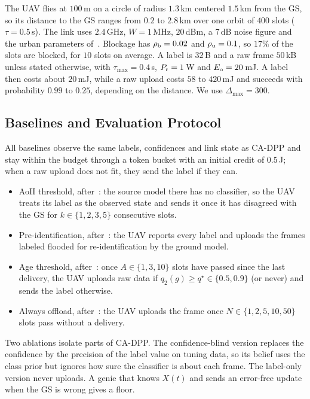 The UAV flies at $100$\,m on a circle of radius $1.3$\,km centered $1.5$\,km from the GS, so its distance to the GS ranges from $0.2$ to $2.8$\,km over one orbit of $400$ slots ($\tau=0.5$\,s). The link uses $2.4$\,GHz, $W=1$\,MHz, $20$\,dBm, a $7$\,dB noise figure and the urban parameters of~\cite{alhourani2014lap}. Blockage has $\rho_{\rm b}=0.02$ and $\rho_{\rm u}=0.1$, so $17\%$ of the slots are blocked, for $10$ slots on average. A label is $32$\,B and a raw frame $50$\,kB unless stated otherwise, with $\tau_{\max}=0.4$\,s, $P_{\rm r}=1$\,W and $E_{\rm o}=20$\,mJ. A label then costs about $20$\,mJ, while a raw upload costs $58$ to $420$\,mJ and succeeds with probability $0.99$ to $0.25$, depending on the distance. We use $\Delta_{\max}=300$.

\subsection{Baselines and Evaluation Protocol}
All baselines observe the same labels, confidences and link state as CA-DPP and stay within the budget through a token bucket with an initial credit of $0.5$\,J; when a raw upload does not fit, they send the label if they can. \begin{itemize}
\item AoII threshold, after~\cite{zakeri2023aoiieh}: the source model there has no classifier, so the UAV treats its label as the observed state and sends it once it has disagreed with the GS for $k\in\{1,2,3,5\}$ consecutive slots.
\item Pre-identification, after~\cite{gan2025taoi}: the UAV reports every label and uploads the frames labeled flooded for re-identification by the ground model.
\item Age threshold, after~\cite{pehlivanoglu2026orbit}: once $A\in\{1,3,10\}$ slots have passed since the last delivery, the UAV uploads raw data if $q_2(g)\ge q^\star\in\{0.5,0.9\}$ (or never) and sends the label otherwise.
\item Always offload, after~\cite{basnayaka2025aomi}: the UAV uploads the frame once $N\in\{1,2,5,10,50\}$ slots pass without a delivery.
\end{itemize}
Two ablations isolate parts of CA-DPP. The confidence-blind version replaces the confidence by the precision of the label value on tuning data, so its belief uses the class prior but ignores how sure the classifier is about each frame. The label-only version never uploads. A genie that knows $X(t)$ and sends an error-free update when the GS is wrong gives a floor.

